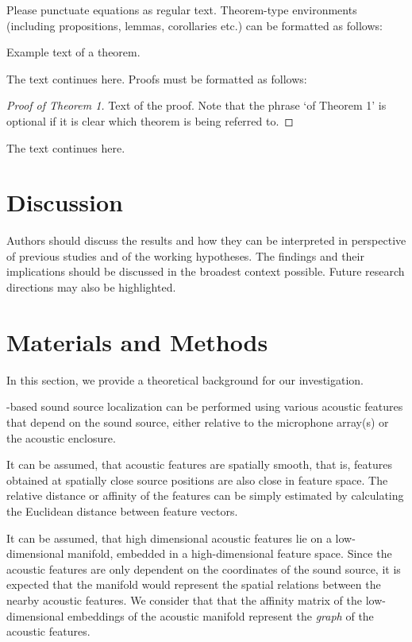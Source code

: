 \documentclass[applsci,article,submit,moreauthors,pdftex]{Definitions/mdpi}
\begin{document}
Please punctuate equations as regular text. Theorem-type environments (including propositions, lemmas, corollaries etc.) can be formatted as follows:
\begin{Theorem}
Example text of a theorem.
\end{Theorem}

The text continues here. Proofs must be formatted as follows:

\begin{proof}[Proof of Theorem 1]
Text of the proof. Note that the phrase `of Theorem 1' is optional if it is clear which theorem is being referred to.
\end{proof}
The text continues here.

\section{Discussion}

Authors should discuss the results and how they can be interpreted in perspective of previous studies and of the working hypotheses. The findings and their implications should be discussed in the broadest context possible. Future research directions may also be highlighted.

\section{Materials and Methods}

In this section, we provide a theoretical background for our investigation.

\ann{}-based sound source localization can be performed using various acoustic features that depend on the sound source, either relative to the microphone array(s) or the acoustic enclosure.

It can be assumed, that acoustic features are spatially smooth, that is, features obtained at spatially close source positions are also close in feature space. The relative distance or affinity of the features can be simply estimated by calculating the Euclidean distance between feature vectors. 

It can be assumed, that high dimensional acoustic features lie on a low-dimensional manifold, embedded in a high-dimensional feature space. 
Since the acoustic features are only dependent on the coordinates of the sound source, it is expected that the manifold would represent the spatial relations between the nearby acoustic features. 
We consider that that the affinity matrix of the low-dimensional embeddings of the acoustic manifold represent the \emph{graph} of the acoustic features.
\end{document}
